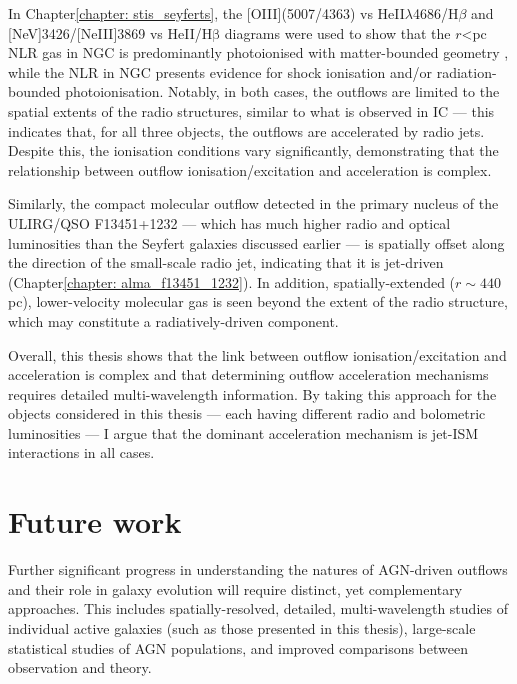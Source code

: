 In Chapter\;\ref{chapter: stis_seyferts}, the [OIII](5007/4363) vs He\;II$\lambda$4686/H$\beta$ and [NeV]3426/[NeIII]3869 vs HeII/H$\mathrm{\beta}$ diagrams were used to show that the $r$\;\textless{}\;pc NLR gas in NGC is predominantly photoionised with matter-bounded geometry \citep{Binette1996}, while the NLR in NGC presents evidence for shock ionisation and/or radiation-bounded photoionisation. Notably, in both cases, the outflows are limited to the spatial extents of the radio structures, similar to what is observed in IC --- this indicates that, for all three objects, the outflows are accelerated by radio jets. Despite this, the ionisation conditions vary significantly, demonstrating that the relationship between outflow ionisation/excitation and acceleration is complex.

Similarly, the compact molecular outflow detected in the primary nucleus of the ULIRG/QSO F13451+1232 --- which has much higher radio and optical luminosities than the Seyfert galaxies discussed earlier --- is spatially offset along the direction of the small-scale radio jet, indicating that it is jet-driven (Chapter\;\ref{chapter: alma_f13451_1232}). In addition, spatially-extended ($r\sim440$\;pc), lower-velocity molecular gas is seen beyond the extent of the radio structure, which may constitute a radiatively-driven component.

Overall, this thesis shows that the link between outflow ionisation/excitation and acceleration is complex and that determining outflow acceleration mechanisms requires detailed multi-wavelength information. By taking this approach for the objects considered in this thesis --- each having different radio and bolometric luminosities --- I argue that the dominant acceleration mechanism is jet-ISM interactions in all cases.

\section{Future work}
\label{section: conclusions_and_future_work: future_work}

Further significant progress in understanding the natures of AGN-driven outflows and their role in galaxy evolution will require distinct, yet complementary approaches. This includes spatially-resolved, detailed, multi-wavelength studies of individual active galaxies (such as those presented in this thesis), large-scale statistical studies of AGN populations, and improved comparisons between observation and theory.


